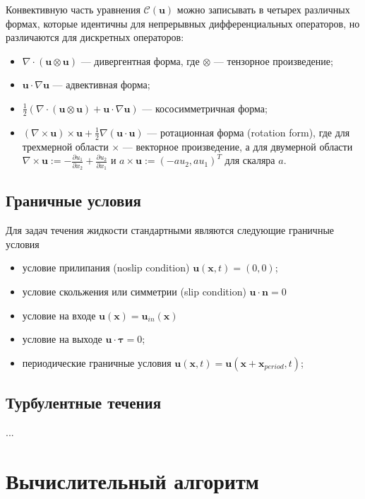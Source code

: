 \documentclass[a4paper,10pt]{report}
\begin{document}
Конвективную часть уравнения $\mathcal{C}(\bm{u})$ можно записывать в четырех различных формах, которые идентичны для непрерывных дифференциальных операторов, но различаются для дискретных операторов:
\begin{itemize}
\item $\nabla \cdot \left(\bm{u} \otimes \bm{u} \right)$ --- дивергентная форма, где $\otimes$ --- тензорное произведение;
\item $\bm{u} \cdot \nabla \bm{u}$ --- адвективная форма;
\item $\frac{1}{2}\left(\nabla \cdot \left(\bm{u} \otimes \bm{u} \right) + \bm{u} \cdot \nabla \bm{u} \right)$ --- кососимметричная форма;
\item $\left( \nabla \times \bm{u} \right) \times \bm{u} + \frac{1}{2} \nabla \left(\bm{u} \cdot \bm{u} \right) $ --- ротационная форма (rotation form), где для трехмерной области $\times$ --- векторное произведение, а для двумерной области $\nabla \times \bm{u} := -\frac{\partial u_1}{\partial x_2} + \frac{\partial u_2}{\partial x_1}$ и $a \times \bm{u} := (-a u_2, a u_1)^T$ для скаляра $a$.
\end{itemize}

\subsection{Граничные условия}
Для задач течения жидкости стандартными являются следующие граничные условия
\begin{itemize}
\item условие прилипания (noslip condition) $\bm{u}(\bm{x}, t) = (0, 0)$;
\item условие скольжения или симметрии (slip condition) $\bm{u} \cdot \bm{n} = 0$
\item условие на входе $\bm{u}(\bm{x}) = \bm{u}_{in}(\bm{x})$
\item условие на выходе $\bm{u} \cdot \bm{\tau} = 0$;
\item периодические граничные условия $\bm{u}(\bm{x}, t) = \bm{u}(\bm{x} + \bm{x}_{period}, t)$;
\end{itemize}

\subsection{Турбулентные течения}
...

\section{Вычислительный алгоритм}
\end{document}
